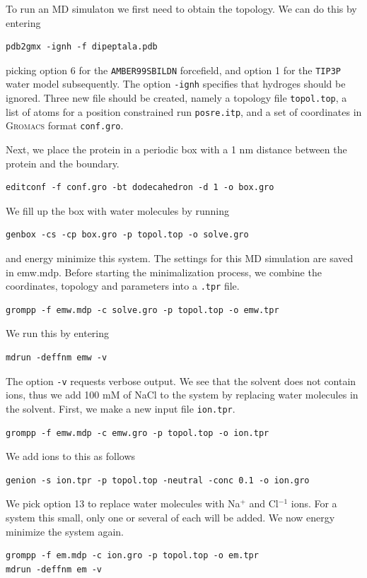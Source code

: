 \documentclass[]{article}
\begin{document}
To run an MD simulaton we first need to obtain the topology. We can do this by entering
%
\begin{lstlisting}
pdb2gmx -ignh -f dipeptala.pdb
\end{lstlisting}
%
picking option 6 for the \texttt{AMBER99SBILDN} forcefield, and option 1 for the \texttt{TIP3P} water model subsequently. The option \texttt{-ignh} specifies that hydroges should be ignored. Three new file should be created, namely a topology file \texttt{topol.top}, a list of atoms for a position constrained run \texttt{posre.itp}, and a set of coordinates in \textsc{Gromacs} format \texttt{conf.gro}. 

Next, we place the protein in a periodic box with a 1 nm distance between the protein and the boundary.
%
\begin{lstlisting}
editconf -f conf.gro -bt dodecahedron -d 1 -o box.gro
\end{lstlisting}
% 
We fill up the box with water molecules by running
%
\begin{lstlisting}
genbox -cs -cp box.gro -p topol.top -o solve.gro
\end{lstlisting}
%
and energy minimize this system. The settings for this MD simulation are saved in emw.mdp. Before starting the minimalization process, we combine the coordinates, topology and parameters into a \texttt{.tpr} file.
%
\begin{lstlisting}
grompp -f emw.mdp -c solve.gro -p topol.top -o emw.tpr
\end{lstlisting}
%
We run this by entering
%
\begin{lstlisting}
mdrun -deffnm emw -v
\end{lstlisting}
%
The option \texttt{-v} requests verbose output. We see that the solvent does not contain ions, thus we add 100 mM of NaCl to the system by replacing water molecules in the solvent. First, we make a new input file \texttt{ion.tpr}.
%
\begin{lstlisting}
grompp -f emw.mdp -c emw.gro -p topol.top -o ion.tpr
\end{lstlisting}
%
We add ions to this as follows
%
\begin{lstlisting}
genion -s ion.tpr -p topol.top -neutral -conc 0.1 -o ion.gro
\end{lstlisting}
%
We pick option 13 to replace water molecules with Na$^+$ and Cl$^{-1}$ ions. For a system this small, only one or several of each will be added. We now energy minimize the system again.
%
\begin{lstlisting}
grompp -f em.mdp -c ion.gro -p topol.top -o em.tpr
mdrun -deffnm em -v
\end{lstlisting}
\end{document}
